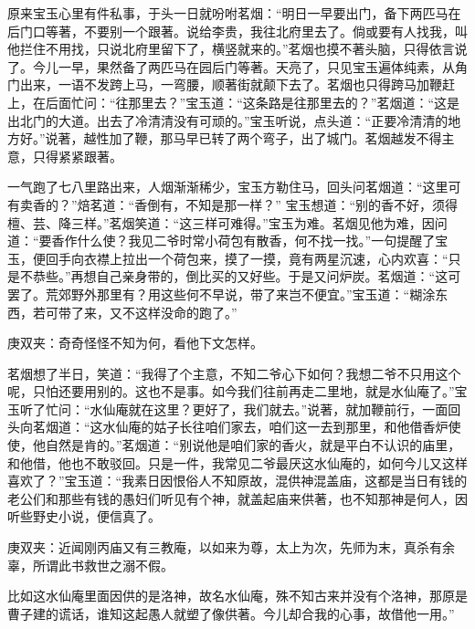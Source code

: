\begin{parag}
    原来宝玉心里有件私事，于头一日就吩咐茗烟：“明日一早要出门，备下两匹马在后门口等著，不要别一个跟著。说给李贵，我往北府里去了。倘或要有人找我，叫他拦住不用找，只说北府里留下了，横竖就来的。”茗烟也摸不著头脑，只得依言说了。今儿一早，果然备了两匹马在园后门等著。天亮了，只见宝玉遍体纯素，从角门出来，一语不发跨上马，一弯腰，顺著街就颠下去了。茗烟也只得跨马加鞭赶上，在后面忙问：“往那里去？”宝玉道：“这条路是往那里去的？”茗烟道：“这是出北门的大道。出去了冷清清没有可顽的。”宝玉听说，点头道：“正要冷清清的地方好。”说著，越性加了鞭，那马早已转了两个弯子，出了城门。茗烟越发不得主意，只得紧紧跟著。
\end{parag}


\begin{parag}
    一气跑了七八里路出来，人烟渐渐稀少，宝玉方勒住马，回头问茗烟道：“这里可有卖香的？”焙茗道：“香倒有，不知是那一样？” 宝玉想道：“别的香不好，须得檀、芸、降三样。”茗烟笑道：“这三样可难得。”宝玉为难。茗烟见他为难，因问道：“要香作什么使？我见二爷时常小荷包有散香，何不找一找。”一句提醒了宝玉，便回手向衣襟上拉出一个荷包来，摸了一摸，竟有两星沉速，心内欢喜：“只是不恭些。”再想自己亲身带的，倒比买的又好些。于是又问炉炭。茗烟道：“这可罢了。荒郊野外那里有？用这些何不早说，带了来岂不便宜。”宝玉道：“糊涂东西，若可带了来，又不这样没命的跑了。”\begin{note}庚双夹：奇奇怪怪不知为何，看他下文怎样。\end{note}茗烟想了半日，笑道：“我得了个主意，不知二爷心下如何？我想二爷不只用这个呢，只怕还要用别的。这也不是事。如今我们往前再走二里地，就是水仙庵了。”宝玉听了忙问：“水仙庵就在这里？更好了，我们就去。”说著，就加鞭前行，一面回头向茗烟道：“这水仙庵的姑子长往咱们家去，咱们这一去到那里，和他借香炉使使，他自然是肯的。”茗烟道：“别说他是咱们家的香火，就是平白不认识的庙里，和他借，他也不敢驳回。只是一件，我常见二爷最厌这水仙庵的，如何今儿又这样喜欢了？”宝玉道：“我素日因恨俗人不知原故，混供神混盖庙，这都是当日有钱的老公们和那些有钱的愚妇们听见有个神，就盖起庙来供著，也不知那神是何人，因听些野史小说，便信真了。\begin{note}庚双夹：近闻刚丙庙又有三教庵，以如来为尊，太上为次，先师为末，真杀有余辜，所谓此书救世之溺不假。\end{note}比如这水仙庵里面因供的是洛神，故名水仙庵，殊不知古来并没有个洛神，那原是曹子建的谎话，谁知这起愚人就塑了像供著。今儿却合我的心事，故借他一用。”
\end{parag}


